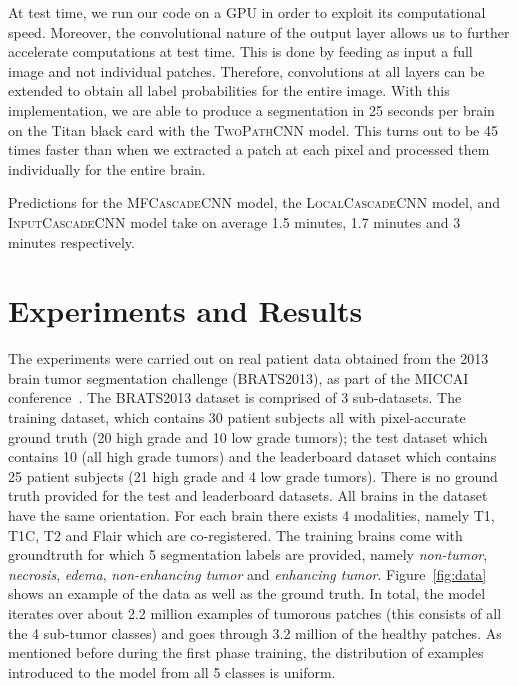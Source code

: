 \documentclass[final,5p,times,twocolumn]{elsarticle}
\begin{document}
At test time, we run our code on a GPU in order to exploit its computational speed. Moreover, the convolutional nature of the output layer allows us to further accelerate computations at test time. This is done by feeding as input a full image and not individual patches.  Therefore, convolutions at all layers can be extended to obtain all label probabilities  for the entire image.
With this implementation, we are able to produce a segmentation in 25 seconds per brain on the Titan black card with the \textsc{TwoPathCNN} model. This turns out to be 45 times faster than when we extracted a patch at each pixel and processed them individually for the entire brain. 

Predictions for the \textsc{MFCascadeCNN} model, the \textsc{LocalCascadeCNN} model, and  \textsc{InputCascadeCNN} model take on average 1.5 minutes, 1.7 minutes and 3 minutes respectively. 





\section{Experiments and Results}
\label{sec:experiments}


The experiments were carried out on real patient data obtained from the 2013 brain tumor segmentation challenge (BRATS2013), as part of the MICCAI conference~\citep{braintumorsegmentationdotorg}. The BRATS2013 dataset is comprised of 3 sub-datasets. The training dataset, which contains 30 patient subjects all with pixel-accurate ground truth (20 high grade and 10 low grade tumors); the test dataset which contains 10 (all high grade tumors) and the leaderboard dataset which contains 25 patient subjects (21 high grade and 4 low grade tumors). There is no ground truth provided for the test and leaderboard datasets. All brains in the dataset have the same orientation. For each brain there exists 4 modalities, namely T1, T1C, T2 and Flair which are co-registered. The training brains come with groundtruth for which 5 segmentation labels are provided, namely {\it non-tumor}, {\it  necrosis}, {\it edema}, {\it non-enhancing tumor} and {\it enhancing tumor}. Figure~\ref{fig:data} shows an example of the data as well as the ground truth. In total, the model iterates over about 2.2 million examples of tumorous patches (this consists of all the 4 sub-tumor classes) and goes through 3.2 million of the healthy patches. As mentioned before during the first phase training, the distribution of examples introduced to the model from all 5 classes is uniform.
\end{document}
